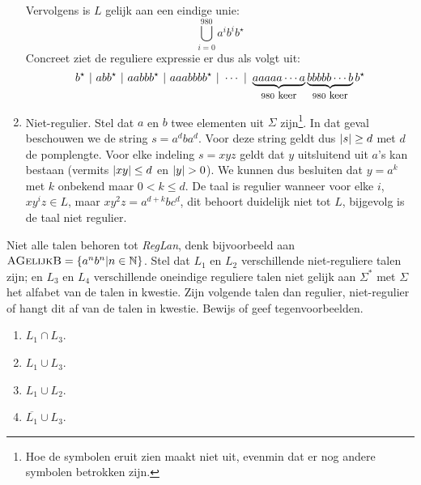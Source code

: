 \documentclass{article}
\newcommand{\lang}[1]{\textsc{#1}}
\begin{document}
\begin{answer}
\begin{enumerate}
\begin{equation}
 \end{equation}
 Vervolgens is $L$ gelijk aan een eindige unie:
 \begin{equation}
  \displaystyle\bigcup_{i=0}^{980} a^ib^ib^\star
 \end{equation}
Concreet ziet de reguliere expressie er dus als volgt uit:
\begin{equation}
 b^\star\ |\ abb^\star\ |\ aabbb^\star\ |\ aaabbbb^\star\ |\ \cdots\ |\ \underbrace{aaaaa\cdots a}_{980\mbox{\small{ keer}}}\underbrace{bbbbb\cdots b}_{980\mbox{\small{ keer}}}b^\star
\end{equation}
 \item Niet-regulier. Stel dat $a$ en $b$ twee elementen uit $\Sigma$ zijn\footnote{Hoe de symbolen eruit zien maakt niet uit, evenmin dat er nog andere symbolen betrokken zijn.}. In dat geval beschouwen we de string $s=a^dba^d$. Voor deze string geldt dus $\left|s\right|\geq d$ met $d$ de pomplengte. Voor elke indeling $s=xyz$ geldt dat $y$ uitsluitend uit $a$'s kan bestaan (vermits $\left|xy\right|\leq d$ en $\abs{y}>0$). We kunnen dus besluiten dat $y=a^k$ met $k$ onbekend maar $0<k\leq d$. De taal is regulier wanneer voor elke $i$, $xy^iz\in L$, maar $xy^2z=a^{d+k}bc^d$, dit behoort duidelijk niet tot $L$, bijgevolg is de taal niet regulier.
\end{enumerate}
\end{answer}
\begin{question}
Niet alle talen behoren tot \emph{RegLan}, denk bijvoorbeeld aan $\lang{AGelijkB}=\accl{a^nb^n|n\in\NN}$. Stel dat $L_1$
en $L_2$ verschillende niet-reguliere talen zijn; en $L_3$ en $L_4$ verschillende oneindige reguliere talen niet gelijk
aan $\Sigma^*$ met $\Sigma$ het alfabet van de talen in kwestie. Zijn volgende talen dan regulier, niet-regulier of
hangt dit af van de talen in kwestie. Bewijs of geef tegenvoorbeelden.
\begin{enumerate}
 \item $L_1\cap L_3$.
 \item $L_1\cup L_3$.
 \item $L_1\cup L_2$.
 \item $\overline{L_1}\cup L_3$.
\end{enumerate}
\end{question}
\end{document}
